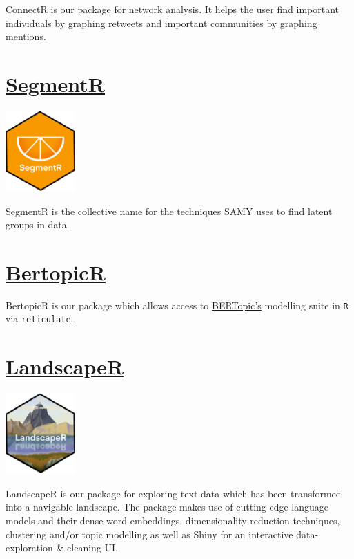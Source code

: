 \documentclass[
  letterpaper,
  DIV=11,
  numbers=noendperiod]{scrreprt}
\begin{document}
ConnectR is our package for network analysis. It helps the user find
important individuals by graphing retweets and important communities by
graphing mentions.

\section{\texorpdfstring{\href{https://avery-island.github.io/SegmentR/index.html}{SegmentR}}{SegmentR}}\label{segmentr}

\includegraphics[width=0.2\textwidth,height=\textheight]{./img/hex/segmentr.png}

SegmentR is the collective name for the techniques SAMY uses to find
latent groups in data.

\section{\texorpdfstring{\href{https://aoiferyan-sc.github.io/BertopicR/articles/manipulating-the-model.html}{BertopicR}}{BertopicR}}\label{bertopicr}

BertopicR is our package which allows access to
\href{https://maartengr.github.io/BERTopic/index.html}{BERTopic's}
modelling suite in \texttt{R} via \texttt{reticulate}.

\section{\texorpdfstring{\href{https://github.com/jpcompartir/LandscapeR}{LandscapeR}}{LandscapeR}}\label{landscaper}

\includegraphics[width=0.2\textwidth,height=\textheight]{./img/hex/landscaper.png}

LandscapeR is our package for exploring text data which has been
transformed into a navigable landscape. The package makes use of
cutting-edge language models and their dense word embeddings,
dimensionality reduction techniques, clustering and/or topic modelling
as well as Shiny for an interactive data-exploration \& cleaning UI.
\end{document}
